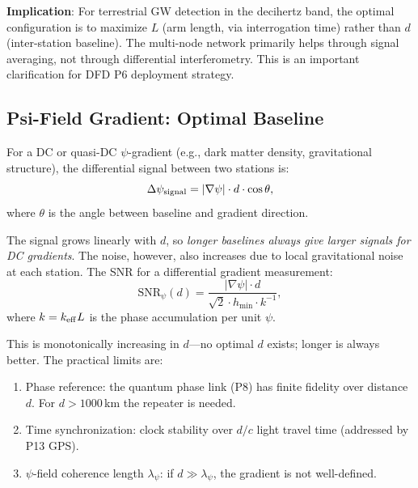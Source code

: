 \documentclass[11pt]{article}
\theoremstyle{definition}
\theoremstyle{remark}
\begin{document}
\textbf{Implication}: For terrestrial GW detection in the decihertz band, the
optimal configuration is to maximize $L$ (arm length, via interrogation time)
rather than $d$ (inter-station baseline). The multi-node network primarily
helps through signal averaging, not through differential interferometry. This is
an important clarification for DFD P6 deployment strategy.

\subsection{Psi-Field Gradient: Optimal Baseline}

For a DC or quasi-DC $\psi$-gradient (e.g., dark matter density, gravitational
structure), the differential signal between two stations is:
\begin{equation}
\Delta\psi_{\rm signal} = |\nabla\psi| \cdot d \cdot \cos\theta,
\end{equation}
where $\theta$ is the angle between baseline and gradient direction.

The signal grows linearly with $d$, so \emph{longer baselines always give larger
signals for DC gradients}. The noise, however, also increases due to local
gravitational noise at each station. The SNR for a differential gradient
measurement:
\begin{equation}
\mathrm{SNR}_\psi(d) = \frac{|\nabla\psi| \cdot d}{\sqrt{2} \cdot h_{\min} \cdot k^{-1}},
\end{equation}
where $k = k_{\rm eff}L$ is the phase accumulation per unit $\psi$.

This is monotonically increasing in $d$---no optimal $d$ exists; longer is
always better. The practical limits are:
\begin{enumerate}
\item Phase reference: the quantum phase link (P8) has finite fidelity over
  distance $d$. For $d > 1000$\,km the repeater is needed.
\item Time synchronization: clock stability over $d/c$ light travel time
  (addressed by P13 GPS).
\item $\psi$-field coherence length $\lambda_\psi$: if $d \gg \lambda_\psi$,
  the gradient is not well-defined.
\end{enumerate}
\end{document}
